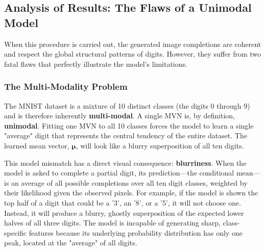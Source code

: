 \subsection{Analysis of Results: The Flaws of a Unimodal Model}
When this procedure is carried out, the generated image completions are coherent and respect the global structural patterns of digits. However, they suffer from two fatal flaws that perfectly illustrate the model's limitations.

\subsubsection{The Multi-Modality Problem}
The MNIST dataset is a mixture of 10 distinct classes (the digits 0 through 9) and is therefore inherently \textbf{multi-modal}. A single MVN is, by definition, \textbf{unimodal}. Fitting one MVN to all 10 classes forces the model to learn a single "average" digit that represents the central tendency of the entire dataset. The learned mean vector, $\boldsymbol{\mu}$, will look like a blurry superposition of all ten digits.

This model mismatch has a direct visual consequence: \textbf{blurriness}. When the model is asked to complete a partial digit, its prediction—the conditional mean—is an average of all possible completions over all ten digit classes, weighted by their likelihood given the observed pixels. For example, if the model is shown the top half of a digit that could be a '3', an '8', or a '5', it will not choose one. Instead, it will produce a blurry, ghostly superposition of the expected lower halves of all three digits. The model is incapable of generating sharp, class-specific features because its underlying probability distribution has only one peak, located at the "average" of all digits.

